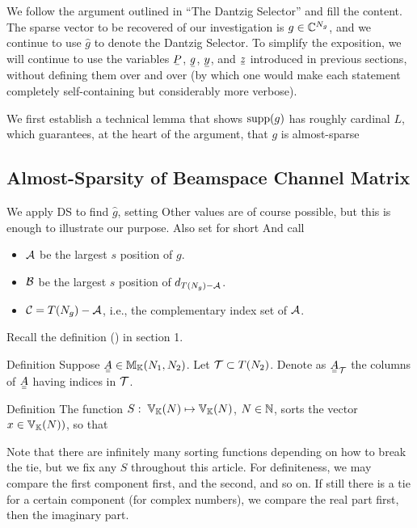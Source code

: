 
We follow the argument outlined in ``The Dantzig Selector'' and fill the content.
The sparse vector to be recovered of our investigation is \(g \in \mathbb{C}^{N_g}\), and we continue to use \(\hat{g}\) to denote the Dantzig Selector.
To simplify the exposition, we will continue to use the variables \(\V{P}\), \(\V{g}\), \(\V{y}\), and \(\V{z}\) introduced in previous sections, without defining them over and over (by which one would make each statement completely self-containing but considerably more verbose).

We first establish a technical lemma that shows \(\mathrm{supp}(g)\) has roughly cardinal \(L\), which guarantees, at the heart of the argument, that \(g\) is almost-sparse 

\subsection{Almost-Sparsity of Beamspace Channel Matrix}

We apply DS to find \(\hat{g}\), setting
Other values are of course possible, but this is enough to illustrate our purpose.
Also set for short
%
%
And call
\begin{itemize}
\item \(\mathcal{A}\) be the largest \(s\) position of \(g\).
\item \(\mathcal{B}\) be the largest \(s\) position of \(d_{T(N_g) -\mathcal{A}}\).
\item \(\mathcal{C} =T(N_g) -\mathcal{A}\), i.e., the complementary index set of \(\mathcal{A}\).
\end{itemize}

Recall the definition () in section 1.

\Result
{Definition}
{
Suppose \(\M{A} \in \MB{M}_{\MB{K}} (N_1, N_2)\).
Let \(\mathcal{T} \subset T (N_2)\).
Denote as \(\M{A}_{\MC{T}}\) the columns of \(\M{A}\) having indices in \(\mathcal{T}\).
}

\Result
{Definition}
{
The function \(S:\; \mathbb{V}_{\mathbb{K}}(N) \mapsto \mathbb{V}_{\mathbb{K}}(N)\), \(N \in \mathbb{N}\), sorts the vector \(x \in \mathbb{V}_{\mathbb{K}}(N))\), so that
}

Note that there are infinitely many sorting functions depending on how to break the tie, but we fix any \(S\) throughout this article.
For definiteness, we may compare the first component first, and the second, and so on.
If still there is a tie for a certain component (for complex numbers), we compare the real part first, then the imaginary part.


